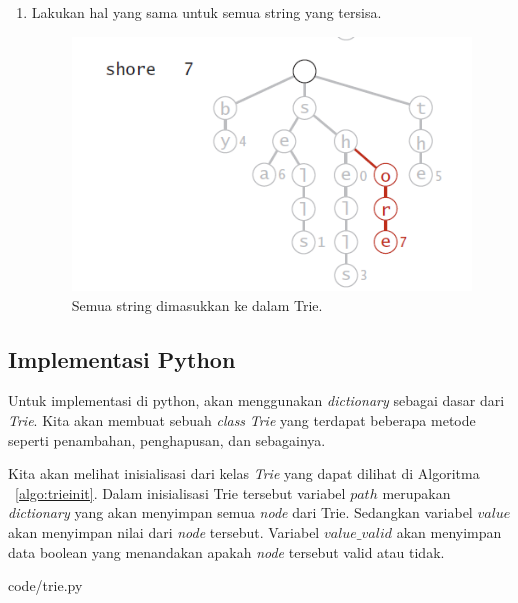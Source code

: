 \begin{enumerate}
\begin{figure}
			\label{fig:FormTrie2}%
		\end{figure}
	\item Lakukan hal yang sama untuk semua string yang tersisa.
		\begin{figure}
			\includegraphics[width=\textwidth,keepaspectratio]{fig/FormTrie3.png}%
			\caption{Semua string dimasukkan ke dalam Trie.}%
			\label{fig:FormTrie3}%
		\end{figure}
\end{enumerate}

\subsection{Implementasi Python}

Untuk implementasi di python, akan menggunakan \textit{dictionary} sebagai dasar dari \textit{Trie}. Kita akan membuat sebuah \textit{class} \textit{Trie} yang terdapat beberapa metode seperti penambahan, penghapusan, dan sebagainya.

Kita akan melihat inisialisasi dari kelas \textit{Trie} yang dapat dilihat di Algoritma ~\ref{algo:trieinit}.
Dalam inisialisasi Trie tersebut variabel $path$ merupakan \textit{dictionary} yang akan menyimpan semua \textit{node} dari Trie. Sedangkan variabel $value$ akan menyimpan nilai dari \textit{node} tersebut. Variabel $value\_valid$ akan menyimpan data boolean yang menandakan apakah \textit{node} tersebut valid atau tidak.


                {code/trie.py}
								
